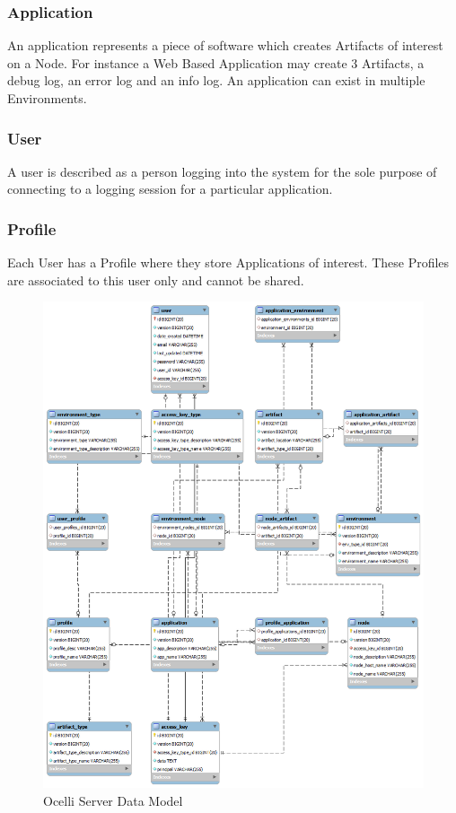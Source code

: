 \documentclass{llncs}
\begin{document}
\subsubsection{Application}

An application represents a piece of software which creates Artifacts of interest on a Node. For instance a Web Based Application may create 3 Artifacts, a debug log, an error log and an info log. An application can exist in multiple Environments.

\subsubsection{User}

A user is described as a person logging into the system for the sole purpose of connecting to a logging session for a particular application. 

\subsubsection{Profile}

Each User has a Profile where they store Applications of interest. These Profiles are associated to this user only and cannot be shared.

\begin{figure}[p]
    \centering
    \includegraphics[scale=0.45]{ocelli.png}
    \caption{Ocelli Server Data Model}
    \label{fig:ocelli_dm}
\end{figure}
\end{document}
